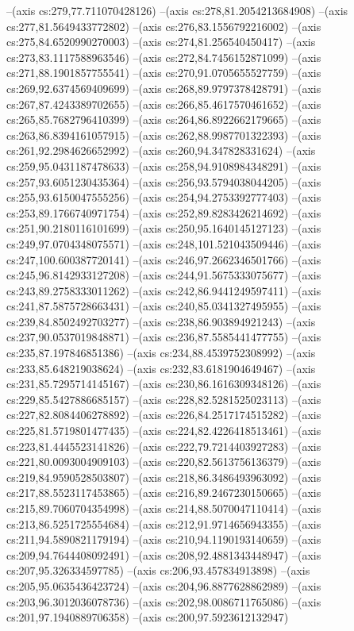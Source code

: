 --(axis cs:279,77.711070428126)
--(axis cs:278,81.2054213684908)
--(axis cs:277,81.5649433772802)
--(axis cs:276,83.1556792216002)
--(axis cs:275,84.6520990270003)
--(axis cs:274,81.256540450417)
--(axis cs:273,83.1117588963546)
--(axis cs:272,84.7456152871099)
--(axis cs:271,88.1901857755541)
--(axis cs:270,91.0705655527759)
--(axis cs:269,92.6374569409699)
--(axis cs:268,89.9797378428791)
--(axis cs:267,87.4243389702655)
--(axis cs:266,85.4617570461652)
--(axis cs:265,85.7682796410399)
--(axis cs:264,86.8922662179665)
--(axis cs:263,86.8394161057915)
--(axis cs:262,88.9987701322393)
--(axis cs:261,92.2984626652992)
--(axis cs:260,94.347828331624)
--(axis cs:259,95.0431187478633)
--(axis cs:258,94.9108984348291)
--(axis cs:257,93.6051230435364)
--(axis cs:256,93.5794038044205)
--(axis cs:255,93.6150047555256)
--(axis cs:254,94.2753392777403)
--(axis cs:253,89.1766740971754)
--(axis cs:252,89.8283426214692)
--(axis cs:251,90.2180116101699)
--(axis cs:250,95.1640145127123)
--(axis cs:249,97.0704348075571)
--(axis cs:248,101.521043509446)
--(axis cs:247,100.600387720141)
--(axis cs:246,97.2662346501766)
--(axis cs:245,96.8142933127208)
--(axis cs:244,91.5675333075677)
--(axis cs:243,89.2758333011262)
--(axis cs:242,86.9441249597411)
--(axis cs:241,87.5875728663431)
--(axis cs:240,85.0341327495955)
--(axis cs:239,84.8502492703277)
--(axis cs:238,86.903894921243)
--(axis cs:237,90.0537019848871)
--(axis cs:236,87.5585441477755)
--(axis cs:235,87.197846851386)
--(axis cs:234,88.4539752308992)
--(axis cs:233,85.648219038624)
--(axis cs:232,83.6181904649467)
--(axis cs:231,85.7295714145167)
--(axis cs:230,86.1616309348126)
--(axis cs:229,85.5427886685157)
--(axis cs:228,82.5281525023113)
--(axis cs:227,82.8084406278892)
--(axis cs:226,84.2517174515282)
--(axis cs:225,81.5719801477435)
--(axis cs:224,82.4226418513461)
--(axis cs:223,81.4445523141826)
--(axis cs:222,79.7214403927283)
--(axis cs:221,80.0093004909103)
--(axis cs:220,82.5613756136379)
--(axis cs:219,84.9590528503807)
--(axis cs:218,86.3486493963092)
--(axis cs:217,88.5523117453865)
--(axis cs:216,89.2467230150665)
--(axis cs:215,89.7060704354998)
--(axis cs:214,88.5070047110414)
--(axis cs:213,86.5251725554684)
--(axis cs:212,91.9714656943355)
--(axis cs:211,94.5890821179194)
--(axis cs:210,94.1190193140659)
--(axis cs:209,94.7644408092491)
--(axis cs:208,92.4881343448947)
--(axis cs:207,95.326334597785)
--(axis cs:206,93.457834913898)
--(axis cs:205,95.0635436423724)
--(axis cs:204,96.8877628862989)
--(axis cs:203,96.3012036078736)
--(axis cs:202,98.0086711765086)
--(axis cs:201,97.1940889706358)
--(axis cs:200,97.5923612132947)
